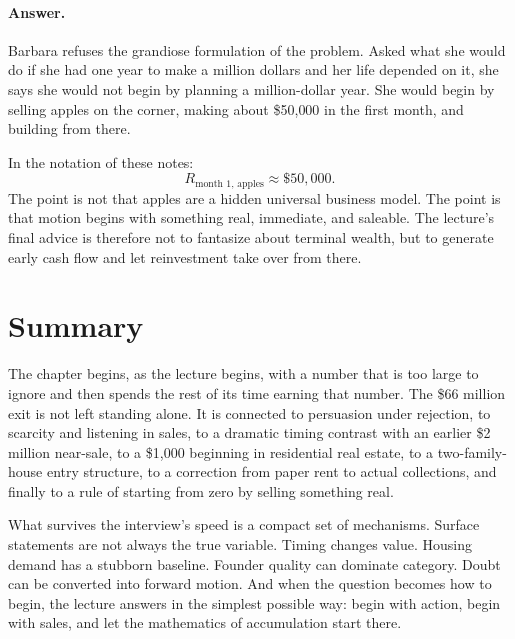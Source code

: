 \paragraph{Answer.} Barbara refuses the grandiose formulation of the problem. Asked what she would do if she had one year to make a million dollars and her life depended on it, she says she would not begin by planning a million-dollar year. She would begin by selling apples on the corner, making about \$50{,}000 in the first month, and building from there.

In the notation of these notes:
\begin{equation}
R_{\text{month 1, apples}}\approx \$50{,}000.
\end{equation}
The point is not that apples are a hidden universal business model. The point is that motion begins with something real, immediate, and saleable. The lecture's final advice is therefore not to fantasize about terminal wealth, but to generate early cash flow and let reinvestment take over from there.

\section{Summary}

The chapter begins, as the lecture begins, with a number that is too large to ignore and then spends the rest of its time earning that number. The \$66 million exit is not left standing alone. It is connected to persuasion under rejection, to scarcity and listening in sales, to a dramatic timing contrast with an earlier \$2 million near-sale, to a \$1{,}000 beginning in residential real estate, to a two-family-house entry structure, to a correction from paper rent to actual collections, and finally to a rule of starting from zero by selling something real.

What survives the interview's speed is a compact set of mechanisms. Surface statements are not always the true variable. Timing changes value. Housing demand has a stubborn baseline. Founder quality can dominate category. Doubt can be converted into forward motion. And when the question becomes how to begin, the lecture answers in the simplest possible way: begin with action, begin with sales, and let the mathematics of accumulation start there.